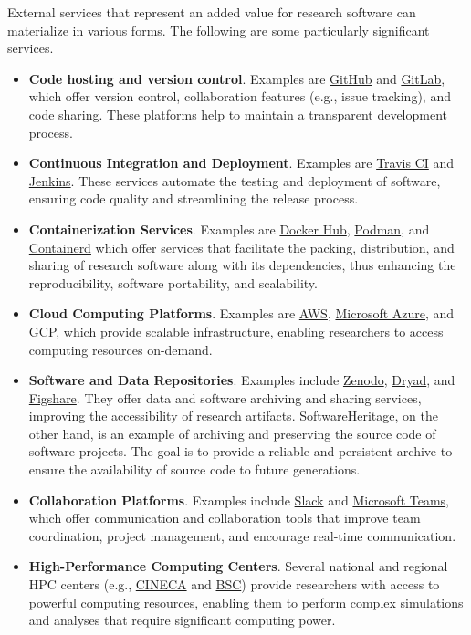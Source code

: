 External services that represent an added value for research software can materialize in various forms. The following are some particularly significant services.


\begin{itemize}
    \item \textbf{Code hosting and version control}. Examples are \href{https://github.com}{GitHub} and \href{https://about.gitlab.com/}{GitLab}, which offer version control, collaboration features (e.g., issue tracking), and code sharing. These platforms help to maintain a transparent development process.
    \item \textbf{Continuous Integration and Deployment}. Examples are \href{https://www.travis-ci.com/}{Travis CI} and \href{https://jenkins.io}{Jenkins}. These services automate the testing and deployment of software, ensuring code quality and streamlining the release process.
    \item \textbf{Containerization Services}. Examples are \href{https://hub.docker.com/}{Docker Hub}, \href{https://podman.io}{Podman}, and \href{https://containerd.io}{Containerd} which offer services that facilitate the packing, distribution, and sharing of research software along with its dependencies, thus enhancing the reproducibility, software portability, and scalability.
    \item \textbf{Cloud Computing Platforms}. Examples are \href{https://aws.amazon.com/}{AWS}, \href{https://azure.microsoft.com/}{Microsoft Azure}, and \href{https://cloud.google.com/}{GCP}, which provide scalable infrastructure, enabling researchers to access computing resources on-demand.
    \item \textbf{Software and Data Repositories}. Examples include \href{https://zenodo.org/}{Zenodo}, \href{https://datadryad.org/}{Dryad}, and \href{https://figshare.com/}{Figshare}. They offer data and software archiving and sharing services, improving the accessibility of research artifacts. \href{https://www.softwareheritage.org/}{SoftwareHeritage}, on the other hand, is an example of archiving and preserving the source code of software projects. The goal is to provide a reliable and persistent archive to ensure the availability of source code to future generations.
    \item \textbf{Collaboration Platforms}. Examples include \href{https://slack.com}{Slack} and \href{https://www.microsoft.com/en-us/microsoft-teams/group-chat-software}{Microsoft Teams}, which offer communication and collaboration tools that improve team coordination, project management, and encourage real-time communication.
    \item \textbf{High-Performance Computing Centers}. Several national and regional HPC centers (e.g., \href{https://www.cineca.it/en}{CINECA} and \href{https://www.bsc.es/}{BSC}) provide researchers with access to powerful computing resources, enabling them to perform complex simulations and analyses that require significant computing power.
\end{itemize}

